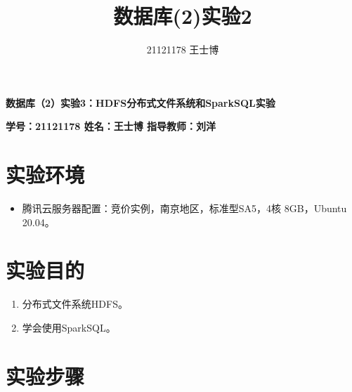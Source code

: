 \documentclass{article}
\title{\Huge 数据库(2)实验2}
\author{21121178 王士博}
\begin{document}
\begin{center}
    \textbf{\huge 数据库（2）实验3：HDFS分布式文件系统和SparkSQL实验}
\end{center}
\begin{center}
    \textbf{\large \textbf{学号：21121178 \quad 姓名：王士博 \quad 指导教师：刘洋}}
\end{center}
\hrulefill
\section{实验环境}
\begin{itemize}
    \item 腾讯云服务器配置：竞价实例，南京地区，标准型SA5，4核 8GB，Ubuntu 20.04。
\end{itemize}
\section{实验目的}
\begin{enumerate}
    \item 分布式文件系统HDFS。
    \item 学会使用SparkSQL。
\end{enumerate}
\section{实验步骤}
\end{document}
